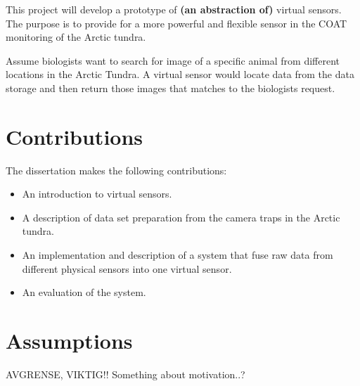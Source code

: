 \documentclass[USenglish]{uit-thesis}
\begin{document}

This project will develop a prototype of \textbf{(an abstraction of)} virtual sensors. The purpose is to provide for a more powerful and flexible sensor in the COAT monitoring of the Arctic tundra. 

Assume biologists want to search for image of a specific animal from different locations in the Arctic Tundra. A virtual sensor would locate data from the data storage and then return those images that matches to the biologists request.



\section{Contributions}

The dissertation makes the following contributions:
\begin{itemize}
\item An introduction to virtual sensors.
\item A description of data set preparation from the camera traps in the Arctic tundra.
\item An implementation and description of a system that fuse raw data from different physical sensors into one virtual sensor.
\item An evaluation of the system.
\end{itemize}


\section{Assumptions}
AVGRENSE, VIKTIG!!
Something about motivation..?
\end{document}
